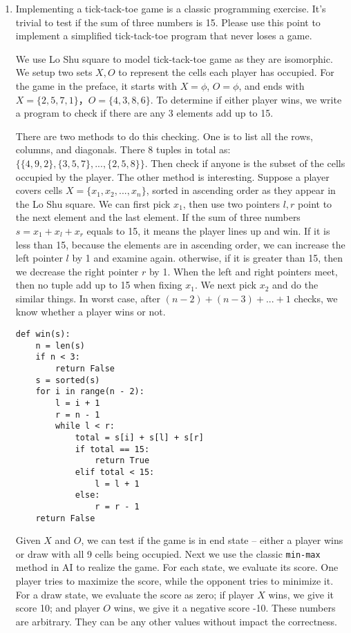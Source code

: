 \documentclass[UTF8]{article}
\begin{document}
\begin{enumerate}
\item{Implementing a tick-tack-toe game is a classic programming exercise. It's trivial to test if the sum of three numbers is 15. Please use this point to implement a simplified tick-tack-toe program that never loses a game.}

We use Lo Shu square to model tick-tack-toe game as they are isomorphic. We setup two sets $X, O$ to represent the cells each player has occupied. For the game in the preface, it starts with $X = \phi$, $O = \phi$, and ends with $X = \{ 2, 5, 7, 1 \}$，$O = \{ 4, 3, 8, 6 \}$. To determine if either player wins, we write a program to check if there are any 3 elements add up to 15.

There are two methods to do this checking. One is to list all the rows, columns, and diagonals. There 8 tuples in total as: $\{ \{4, 9, 2\}, \{3, 5, 7\}, ..., \{2, 5, 8\} \}$. Then check if anyone is the subset of the cells occupied by the player. The other method is interesting. Suppose a player covers cells $ X = \{x_1, x_2, ..., x_n\}$, sorted in ascending order as they appear in the Lo Shu square. We can first pick $x_1$, then use two pointers $l, r$ point to the next element and the last element. If the sum of three numbers $s = x_1 + x_l + x_r$ equals to 15, it means the player lines up and win. If it is less than 15, because the elements are in ascending order, we can increase the left pointer $l$ by 1 and examine again. otherwise, if it is greater than 15, then we decrease the right pointer $r$ by 1. When the left and right pointers meet, then no tuple add up to 15 when fixing $x_1$. We next pick $x_2$ and do the similar things. In worst case, after $(n - 2)+ (n - 3) + ... + 1$ checks, we know whether a player wins or not.

\lstset{language=Python
    , frame=single
}
\begin{lstlisting}
def win(s):
    n = len(s)
    if n < 3:
        return False
    s = sorted(s)
    for i in range(n - 2):
        l = i + 1
        r = n - 1
        while l < r:
            total = s[i] + s[l] + s[r]
            if total == 15:
                return True
            elif total < 15:
                l = l + 1
            else:
                r = r - 1
    return False
\end{lstlisting}

Given $X$ and $O$, we can test if the game is in end state -- either a player wins or draw with all 9 cells being occupied. Next we use the classic \texttt{min-max} method in AI to realize the game. For each state, we evaluate its score. One player tries to maximize the score, while the opponent tries to minimize it. For a draw state, we evaluate the score as zero; if player $X$ wins, we give it score 10; and player $O$ wins, we give it a negative score -10. These numbers are arbitrary. They can be any other values without impact the correctness.


\end{enumerate}
\end{document}
